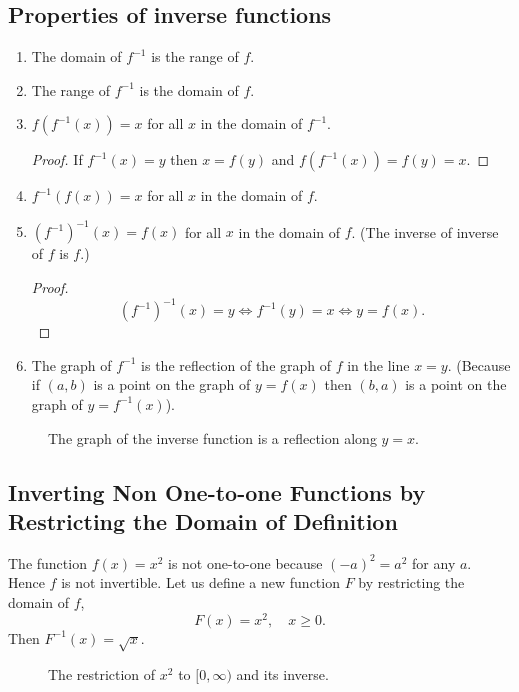 \documentclass[../calc1-main.tex]{subfiles}
\begin{document}
\subsection*{Properties of inverse functions}
\begin{enumerate}
  \item The domain of $f^{-1}$ is the range of $f$.
  \item The range of $f^{-1}$ is the domain of $f$.
  \item $f(f^{-1}(x)) = x$ for all $x$ in the domain of $f^{-1}$.
  \begin{proof}
    If $f^{-1}(x) = y$ then $x = f(y)$ and $f(f^{-1}(x)) = f(y) = x$.
  \end{proof}
  \item $f^{-1}(f(x)) = x$ for all $x$ in the domain of $f$.
  \item $(f^{-1})^{-1}(x) = f(x)$ for all $x$ in the domain of $f$. (The inverse of inverse of $f$ is $f$.)
  \begin{proof}
    \[
      (f^{-1})^{-1}(x) = y \iff f^{-1}(y) = x \iff y = f(x).
    \]
  \end{proof}
  \item The graph of $f^{-1}$ is the reflection of the graph of $f$ in the line $x=y$. (Because if $(a, b)$ is a point on the graph of $y=f(x)$ then $(b, a)$ is a point on the graph of $y = f^{-1}(x)$).
\end{enumerate}
\begin{figure}[H]
  \centering
  
  \caption{The graph of the inverse function is a reflection along $y=x$.}
\end{figure}

\subsection*{Inverting Non One-to-one Functions by Restricting the Domain of Definition}
\begin{minipage}{0.5\textwidth}
  The function $f(x) = x^2$ is not one-to-one because $(-a)^2 = a^2$ for any $a$. Hence $f$ is not invertible. Let us define a new function $F$ by restricting the domain of $f$,
  \[
    F(x) = x^2, \quad x \geq 0.
  \]
  Then $F^{-1}(x) = \sqrt{x}$.
\end{minipage}%
\begin{minipage}{0.5\textwidth}
  \begin{figure}[H]
    \centering
    
    \caption{The restriction of $x^2$ to $[0, \infty)$ and its inverse.}
  \end{figure}
\end{minipage}
\end{document}
